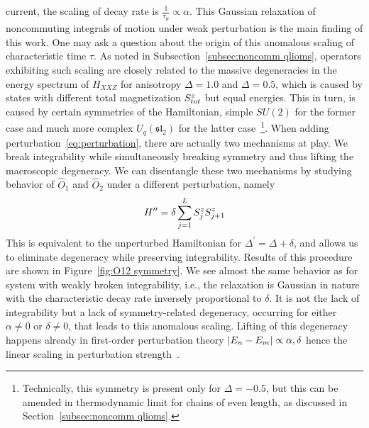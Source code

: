 current, the scaling of decay rate is \(\frac{1}{\tau_{\mu}} \propto \alpha\). This Gaussian relaxation
of noncommuting integrals of motion under weak perturbation is the main finding of this work.
One may ask a question about the origin of this anomalous scaling of characteristic time
\(\tau\). As noted in Subsection~\ref{subsec:noncomm qlioms}, operators exhibiting such scaling
are closely related to the massive degeneracies in the energy spectrum of \(H_{XXZ}\) for
anisotropy  \(\Delta=1.0\) and \(\Delta = 0.5\), which is caused by states with
different total magnetization \(S^{z}_{tot}\) but
equal energies. This in turn, is caused by certain symmetries of the Hamiltonian, simple \(SU(2)\) for
the former case and much more complex \(U_q(\mathfrak{sl}_2)\) for the latter 
case~\footnote{Technically, this symmetry is present only for \(\Delta=-0.5\), but this
can be amended in thermodynamic limit for chains of even length, as discussed in 
Section~\ref{subsec:noncomm qlioms}. }. 
When adding perturbation~\eqref{eq:perturbation}, there are actually two mechanisms at play. We break
integrability while simultaneously breaking symmetry and thus lifting the macroscopic degeneracy.
We can disentangle these two mechanisms by studying behavior of \(\hat{O}_1\) and \(\hat{O}_2\)
under a different perturbation, namely
\begin{equation}
  H^{\prime\prime} = \delta \sum_{j=1}^{L} S^{z}_j S^{z}_{j+1}
\end{equation}
This is equivalent to the unperturbed Hamiltonian for \(\Delta^{\prime} = \Delta + \delta\),
and allows us to eliminate degeneracy while preserving integrability. Results of this procedure
are shown in Figure~\ref{fig:O12 symmetry}. We see almost the same behavior as for system
with weakly broken integrability, i.e., the relaxation is Gaussian in nature with the
characteristic decay rate inversely proportional to \(\delta\). It is not the lack of
integrability but a lack of symmetry-related degeneracy, occurring for either \(\alpha\neq 0\)
or \(\delta\neq 0\), that leads to this anomalous scaling. Lifting of this degeneracy
happens already in first-order perturbation theory \(\abs{E_n-E_m} \propto \alpha,\delta\)
hence the linear scaling in perturbation strength~\autocite{Mierzejewski2021}.
